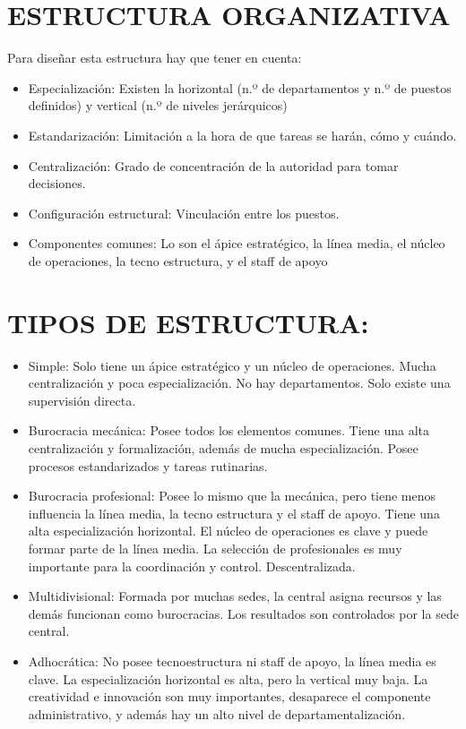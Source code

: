 \documentclass[12pt, twoside, openright]{report} %
\begin{document}
\section{ESTRUCTURA ORGANIZATIVA}
Para diseñar esta estructura hay que tener en cuenta:
\begin{itemize}
	\item Especialización: Existen la horizontal (n.º de departamentos y n.º de puestos definidos) y
	      vertical (n.º de niveles jerárquicos)
	\item Estandarización: Limitación a la hora de que tareas se harán, cómo y cuándo.
	\item Centralización: Grado de concentración de la autoridad para tomar decisiones.
	\item Configuración estructural: Vinculación entre los puestos.
	\item Componentes comunes: Lo son el ápice estratégico, la línea media, el núcleo de operaciones,
	      la tecno estructura, y el staff de apoyo
\end{itemize}

\section{TIPOS DE ESTRUCTURA:}
\begin{itemize}
	\item Simple: Solo tiene un ápice estratégico y un núcleo de operaciones. Mucha centralización y poca especialización. No hay departamentos. Solo existe una supervisión directa.
	\item Burocracia mecánica: Posee todos los elementos comunes. Tiene una alta centralización y formalización, además de mucha especialización. Posee procesos estandarizados y tareas rutinarias.
	\item Burocracia profesional: Posee lo mismo que la mecánica, pero tiene menos influencia la línea media, la tecno estructura y el staff de apoyo. Tiene una alta especialización horizontal. El núcleo de operaciones es clave y puede formar parte de la línea media. La selección de profesionales es muy importante para la coordinación y control. Descentralizada.
	\item Multidivisional: Formada por muchas sedes, la central asigna recursos y las demás funcionan como burocracias. Los resultados son controlados por la sede central.
	\item Adhocrática: No posee tecnoestructura ni staff de apoyo, la línea media es clave. La especialización horizontal es alta, pero la vertical muy baja. La creatividad e innovación son muy importantes, desaparece el componente administrativo, y además hay un alto nivel de departamentalización.
\end{itemize}
\pagebreak
\end{document}
